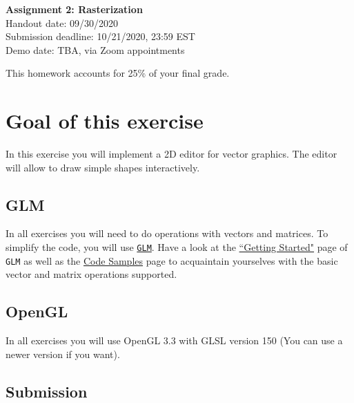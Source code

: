 \documentclass[11pt]{article}
\begin{document}
\hspace{50pt}

\begin{center}

{\Huge \textbf{Assignment 2: Rasterization}}\\
\vspace{10pt}
Handout date: 09/30/2020\\
Submission deadline: 10/21/2020,  23:59 EST\\
Demo date: TBA, via Zoom appointments
\end{center}

\noindent This homework accounts for 25\% of your final grade. 

\section*{Goal of this exercise}
In this exercise you will implement a 2D editor for vector graphics. The editor will allow to draw simple shapes interactively.

\subsection*{GLM}
In all exercises you will need to do operations with vectors and matrices. To simplify the code, you will use \href{https://glm.g-truc.net/0.9.9/index.html}{\texttt{GLM}}. 
Have a look at the \href{https://github.com/g-truc/glm/blob/master/manual.md#section1}{``Getting Started"} page of \texttt{GLM} as well as the \href{https://github.com/g-truc/glm/blob/master/manual.md#section8}{Code Samples} page to acquaintain yourselves with the basic vector and matrix operations supported. 

\subsection*{OpenGL}
In all exercises you will use OpenGL 3.3 with GLSL version 150 (You can use a newer version if you want).

\subsection*{Submission}

\end{document}
